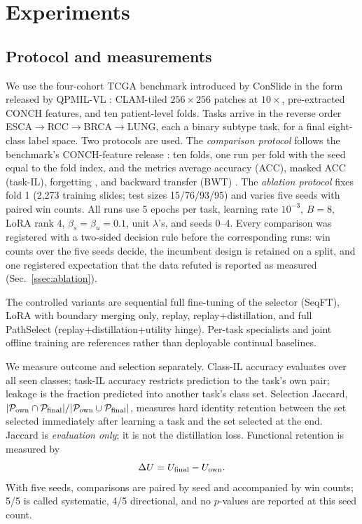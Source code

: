 \documentclass{article}
\newcommand{\Psel}{\mathcal{P}}
\begin{document}
\section{Experiments}
\label{sec:exp}

\subsection{Protocol and measurements}

We use the four-cohort TCGA benchmark introduced by ConSlide \cite{huang2023conslide} in the form released by QPMIL-VL \cite{gou2025qpmil}: CLAM-tiled $256\times256$ patches at $10\times$, pre-extracted CONCH features, and ten patient-level folds. Tasks arrive in the reverse order ESCA$\rightarrow$RCC$\rightarrow$BRCA$\rightarrow$LUNG, each a binary subtype task, for a final eight-class label space. Two protocols are used. The \emph{comparison protocol} follows the benchmark's CONCH-feature release \cite{gou2025qpmil}: ten folds, one run per fold with the seed equal to the fold index, and the metrics average accuracy (ACC), masked ACC (task-IL), forgetting \cite{chaudhry2018rwalk}, and backward transfer (BWT) \cite{lopezpaz2017gem}. The \emph{ablation protocol} fixes fold 1 (2,273 training slides; test sizes 15/76/93/95) and varies five seeds with paired win counts.
All runs use 5 epochs per task, learning rate $10^{-3}$, $B=8$, LoRA rank 4, $\beta_s{=}\beta_u{=}0.1$, unit $\lambda$'s, and seeds 0--4. Every comparison was registered with a two-sided decision rule before the corresponding runs: win counts over the five seeds decide, the incumbent design is retained on a split, and one registered expectation that the data refuted is reported as measured (Sec.~\ref{ssec:ablation}).

The controlled variants are sequential full fine-tuning of the selector (SeqFT), LoRA with boundary merging only, replay, replay+distillation, and full PathSelect (replay+distillation+utility hinge).
Per-task specialists and joint offline training are references rather than deployable continual baselines.

We measure outcome and selection separately.
Class-IL accuracy evaluates over all seen classes; task-IL accuracy restricts prediction to the task's own pair; leakage is the fraction predicted into another task's class set.
Selection Jaccard, $|\Psel_{\rm own}\cap\Psel_{\rm final}|/|\Psel_{\rm own}\cup\Psel_{\rm final}|$, measures hard identity retention between the set selected immediately after learning a task and the set selected at the end.
Jaccard is \emph{evaluation only}; it is not the distillation loss.
Functional retention is measured by
\[
\Delta U=U_{\rm final}-U_{\rm own}.
\]
With five seeds, comparisons are paired by seed and accompanied by win counts; 5/5 is called systematic, 4/5 directional, and no $p$-values are reported at this seed count.
\end{document}
